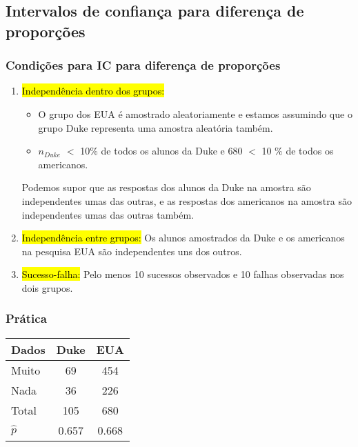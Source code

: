 
\subsection{Intervalos de confiança para diferença de proporções}


\begin{frame}
\frametitle{Condições para IC para diferença de proporções}

\begin{enumerate}
\justifying
\item \hl{Independência dentro dos grupos: }
\begin{itemize}
\justifying
\item O grupo dos EUA é amostrado aleatoriamente e estamos assumindo que o grupo Duke representa uma amostra aleatória também.
\pause
\justifying
\item $n_{Duke}$ $<$ 10\% de todos os alunos da Duke e 680 $ <$ 10 \% de todos os americanos.
\end{itemize}
\pause
\justifying
Podemos supor que as respostas dos alunos da Duke na amostra são independentes umas das outras, e as respostas dos americanos na amostra são independentes umas das outras também.

\pause
\justifying
\item \hl{Independência entre grupos: }
Os alunos amostrados da Duke e os americanos na pesquisa EUA são independentes uns dos outros.

\pause
\justifying
\item \hl{Sucesso-falha:} 
Pelo menos 10 sucessos observados e 10 falhas observadas nos dois grupos.

\end{enumerate}

\end{frame}


\begin{frame}
\frametitle{Prática}
\justifying
{}

{\footnotesize
\begin{center}
\begin{tabular}{l | c c}
Dados			& Duke		& EUA \\
\hline
Muito	& 69			& 454 \\
Nada & 36			& 226 \\
\hline
Total			& 105		& 680 \\
\hline
\pause
$\hat{p}$		& 0.657		& 0.668
\end{tabular}
\end{center}
}

\end{frame}

